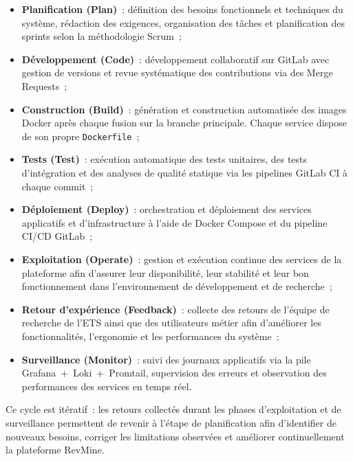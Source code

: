 \begin{itemize}
    \item \textbf{Planification (Plan)}~: définition des besoins fonctionnels et techniques du
          système, rédaction des exigences, organisation des tâches et planification des sprints
          selon la méthodologie Scrum~;

    \item \textbf{Développement (Code)}~: développement collaboratif sur GitLab avec gestion de
          versions et revue systématique des contributions via des Merge Requests~;

    \item \textbf{Construction (Build)}~: génération et construction automatisée des images Docker
          après chaque fusion sur la branche principale. Chaque service dispose de son propre
          \texttt{Dockerfile}~;

    \item \textbf{Tests (Test)}~: exécution automatique des tests unitaires, des tests
          d'intégration et des analyses de qualité statique via les pipelines GitLab CI à
          chaque commit~;

    \item \textbf{Déploiement (Deploy)}~: orchestration et déploiement des services applicatifs
          et d'infrastructure à l'aide de Docker Compose et du pipeline CI/CD GitLab~;

    \item \textbf{Exploitation (Operate)}~: gestion et exécution continue des services de la
          plateforme afin d'assurer leur disponibilité, leur stabilité et leur bon fonctionnement
          dans l'environnement de développement et de recherche~;

    \item \textbf{Retour d'expérience (Feedback)}~: collecte des retours de l'équipe de recherche
          de l'ETS ainsi que des utilisateurs métier afin d'améliorer les fonctionnalités,
          l'ergonomie et les performances du système~;

    \item \textbf{Surveillance (Monitor)}~: suivi des journaux applicatifs via la pile
          Grafana~+~Loki~+~Promtail, supervision des erreurs et observation des performances des
          services en temps réel.
\end{itemize}

Ce cycle est itératif~: les retours collectés durant les phases d'exploitation et de surveillance
permettent de revenir à l'étape de planification afin d'identifier de nouveaux besoins, corriger
les limitations observées et améliorer continuellement la plateforme RevMine.

